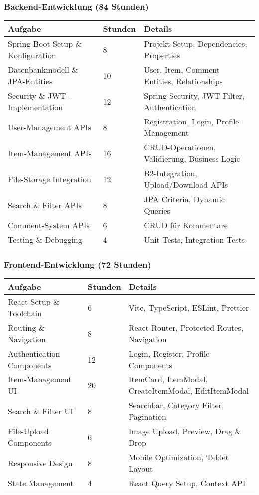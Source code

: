\documentclass[a4paper,12pt]{article}
\begin{document}
\subsubsection{Backend-Entwicklung (84 Stunden)}
\begin{longtable}{|p{}|p{}|p{}|}
\hline
\textbf{Aufgabe} & \textbf{Stunden} & \textbf{Details} \\
\hline
Spring Boot Setup \& Konfiguration & 8 & Projekt-Setup, Dependencies, Properties \\
\hline
Datenbankmodell \& JPA-Entities & 10 & User, Item, Comment Entities, Relationships \\
\hline
Security \& JWT-Implementation & 12 & Spring Security, JWT-Filter, Authentication \\
\hline
User-Management APIs & 8 & Registration, Login, Profile-Management \\
\hline
Item-Management APIs & 16 & CRUD-Operationen, Validierung, Business Logic \\
\hline
File-Storage Integration & 12 & B2-Integration, Upload/Download APIs \\
\hline
Search \& Filter APIs & 8 & JPA Criteria, Dynamic Queries \\
\hline
Comment-System APIs & 6 & CRUD für Kommentare \\
\hline
Testing \& Debugging & 4 & Unit-Tests, Integration-Tests \\
\hline
\end{longtable}

\subsubsection{Frontend-Entwicklung (72 Stunden)}
\begin{longtable}{|p{}|p{}|p{}|}
\hline
\textbf{Aufgabe} & \textbf{Stunden} & \textbf{Details} \\
\hline
React Setup \& Toolchain & 6 & Vite, TypeScript, ESLint, Prettier \\
\hline
Routing \& Navigation & 8 & React Router, Protected Routes, Navigation \\
\hline
Authentication Components & 12 & Login, Register, Profile Components \\
\hline
Item-Management UI & 20 & ItemCard, ItemModal, CreateItemModal, EditItemModal \\
\hline
Search \& Filter UI & 8 & Searchbar, Category Filter, Pagination \\
\hline
File-Upload Components & 6 & Image Upload, Preview, Drag \& Drop \\
\hline
Responsive Design & 8 & Mobile Optimization, Tablet Layout \\
\hline
State Management & 4 & React Query Setup, Context API \\
\hline
\end{longtable}
\end{document}
